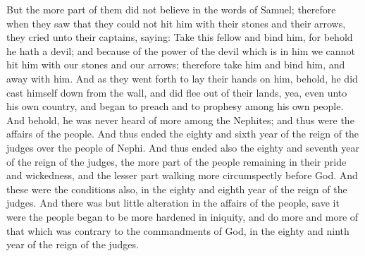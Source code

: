 But the more part of them did not believe in the words of Samuel; therefore when they saw that they could not hit him with their stones and their arrows, they cried unto their captains, saying: Take this fellow and bind him, for behold he hath a devil; and because of the power of the devil which is in him we cannot hit him with our stones and our arrows; therefore take him and bind him, and away with him.
\bverse \iffalse And as they went forth to lay their hands on him, behold, he did cast himself down from the wall, and did flee out of their lands, yea, even unto his own country, and began to preach and to prophesy among his own people. \fi
And as they went forth to lay their hands on him, behold, he did cast himself down from the wall, and did flee out of their lands, yea, even unto his own country, and began to preach and to prophesy among his own people.
\bverse \iffalse And behold, he was never heard of more among the Nephites; and thus were the affairs of the people. \fi
And behold, he was never heard of more among the Nephites; and thus were the affairs of the people.
\bverse \iffalse And thus ended the eighty and sixth year of the reign of the judges over the people of Nephi. \fi
And thus ended the eighty and sixth year of the reign of the judges over the people of Nephi.
\bverse \iffalse And thus ended also the eighty and seventh year of the reign of the judges, the more part of the people remaining in their pride and wickedness, and the lesser part walking more circumspectly before God. \fi
And thus ended also the eighty and seventh year of the reign of the judges, the more part of the people remaining in their pride and wickedness, and the lesser part walking more circumspectly before God.
\bverse \iffalse And these were the conditions also, in the eighty and eighth year of the reign of the judges. \fi
And these were the conditions also, in the eighty and eighth year of the reign of the judges.
\bverse \iffalse And there was but little alteration in the affairs of the people, save it were the people began to be more hardened in iniquity, and do more and more of that which was contrary to the commandments of God, in the eighty and ninth year of the reign of the judges. \fi
And there was but little alteration in the affairs of the people, save it were the people began to be more hardened in iniquity, and do more and more of that which was contrary to the commandments of God, in the eighty and ninth year of the reign of the judges.
\bverse \iffalse But it came to pass in the ninetieth year of the reign of the judges, there were great signs given unto the people, and wonders; and the words of the prophets began to be fulfilled. \fi
